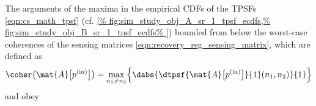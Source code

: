 The arguments of
the maxima in
the empirical \acp{CDF} of
the \acp{TPSF}
\eqref{eqn:cs_math_tpsf}
(cf. \cref{%
  fig:sim_study_obj_A_sr_1_tpsf_ecdfs,%
  fig:sim_study_obj_B_sr_1_tpsf_ecdfs%
}) bounded from
below
the worst-case coherences of
the sensing matrices
\eqref{eqn:recovery_reg_sensing_matrix}, which are defined as
\cite[Def. 5.1]{book:Foucart2013}
\begin{equation}
  \coher\bigl( \mat{A}\bigl[ p^{(\text{in})} \bigr] \bigr)
  =
  \underset{ n_{1} \neq n_{2} }{ \max }
  \Bigl\{
    \dabs{ \dtpsf{ \mat{A}\bigl[ p^{(\text{in})} \bigr] }{1}( n_{1}, n_{2} ) }{1}
  \Bigr\}
 \label{eqn:disc_coherence}
\end{equation}
and obey
